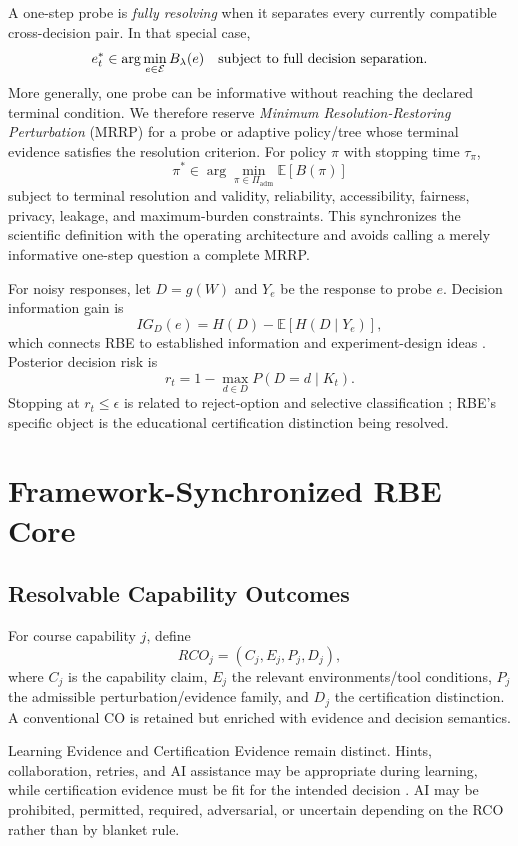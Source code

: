 \documentclass[11pt]{article}
\begin{document}
A one-step probe is \emph{fully resolving} when it separates every currently compatible cross-decision pair. In that special case,
\[
e_t^*\in\arg\min_{e\in\mathcal{E}} B_\lambda(e)\quad\text{subject to full decision separation.}
\]
More generally, one probe can be informative without reaching the declared terminal condition. We therefore reserve \emph{Minimum Resolution-Restoring Perturbation} (MRRP) for a probe or adaptive policy/tree whose terminal evidence satisfies the resolution criterion. For policy $\pi$ with stopping time $\tau_\pi$,
\[
\pi^*\in\arg\min_{\pi\in\Pi_{\mathrm{adm}}}\mathbb{E}[B(\pi)]
\]
subject to terminal resolution and validity, reliability, accessibility, fairness, privacy, leakage, and maximum-burden constraints. This synchronizes the scientific definition with the operating architecture and avoids calling a merely informative one-step question a complete MRRP.

For noisy responses, let $D=g(W)$ and $Y_e$ be the response to probe $e$. Decision information gain is
\[
IG_D(e)=H(D)-\mathbb{E}[H(D\mid Y_e)],
\]
which connects RBE to established information and experiment-design ideas \parencite{shannon1948,lindley1956,blackwell1953}. Posterior decision risk is
\[
r_t=1-\max_{d\in D}P(D=d\mid K_t).
\]
Stopping at $r_t\le\epsilon$ is related to reject-option and selective classification \parencite{chow1970,elyaniv2010,gangrade2021}; RBE's specific object is the educational certification distinction being resolved.

\section{Framework-Synchronized RBE Core}
\subsection{Resolvable Capability Outcomes}
For course capability $j$, define
\[
RCO_j=(C_j,E_j,P_j,D_j),
\]
where $C_j$ is the capability claim, $E_j$ the relevant environments/tool conditions, $P_j$ the admissible perturbation/evidence family, and $D_j$ the certification distinction. A conventional CO is retained but enriched with evidence and decision semantics.

Learning Evidence and Certification Evidence remain distinct. Hints, collaboration, retries, and AI assistance may be appropriate during learning, while certification evidence must be fit for the intended decision \parencite{black1998assessment,hattie2007feedback,nicol2006feedback}. AI may be prohibited, permitted, required, adversarial, or uncertain depending on the RCO rather than by blanket rule.
\end{document}
